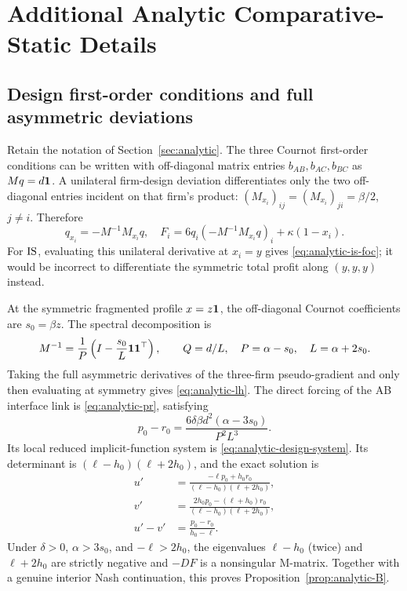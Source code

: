 \section{Additional Analytic Comparative-Static Details}
\label{app:analytic-proofs}

\subsection{Design first-order conditions and full asymmetric deviations}

Retain the notation of Section~\ref{sec:analytic}.
The three Cournot first-order conditions can be
written with off-diagonal matrix entries
$b_{AB},b_{AC},b_{BC}$ as
$Mq=d{\bf1}$. A unilateral firm-design deviation
differentiates only the two off-diagonal entries
incident on that firm's product:
$(M_{x_i})_{ij}=(M_{x_i})_{ji}=\beta/2$, $j\ne i$.
Therefore
\[
 q_{x_i}=-M^{-1}M_{x_i}q,\quad
 F_i=6q_i(-M^{-1}M_{x_i}q)_i+\kappa(1-x_i).
\]
For $\mathrm{IS}$, evaluating this unilateral derivative at
$x_i=y$ gives \eqref{eq:analytic-is-foc}; it would
be incorrect to differentiate the symmetric total
profit along $(y,y,y)$ instead.

At the symmetric fragmented profile $x=z{\bf1}$,
the off-diagonal Cournot coefficients are
$s_0=\beta z$. The spectral decomposition is
\[
 M^{-1}
 =\frac{1}{P}\left(I-\frac{s_0}{L}{\bf1}{\bf1}^\top\right),
 \qquad Q=d/L,\quad P=\alpha-s_0,\quad L=\alpha+2s_0.
\]
Taking the full asymmetric derivatives of the
three-firm pseudo-gradient and only then evaluating
at symmetry gives \eqref{eq:analytic-lh}.
The direct forcing of the AB interface link is
\eqref{eq:analytic-pr}, satisfying
\[
 p_0-r_0
 =\frac{6\delta\beta d^2(\alpha-3s_0)}{P^2L^3}.
\]
Its local reduced implicit-function system is
\eqref{eq:analytic-design-system}. Its determinant
is $(\ell-h_0)(\ell+2h_0)$, and the exact
solution is
\[
\begin{split}
 u'&=\frac{-\ell p_0+h_0 r_0}
               {(\ell-h_0)(\ell+2h_0)},\\
 v'&=\frac{2h_0p_0-(\ell+h_0)r_0}
               {(\ell-h_0)(\ell+2h_0)},\\
 u'-v'&=\frac{p_0-r_0}{h_0-\ell}.
\end{split}
\]
Under $\delta>0$, $\alpha>3s_0$, and
$-\ell>2h_0$, the eigenvalues
$\ell-h_0$ (twice) and $\ell+2h_0$
are strictly negative and $-DF$ is
a nonsingular M-matrix. Together with a
genuine interior Nash continuation, this
proves Proposition~\ref{prop:analytic-B}.

